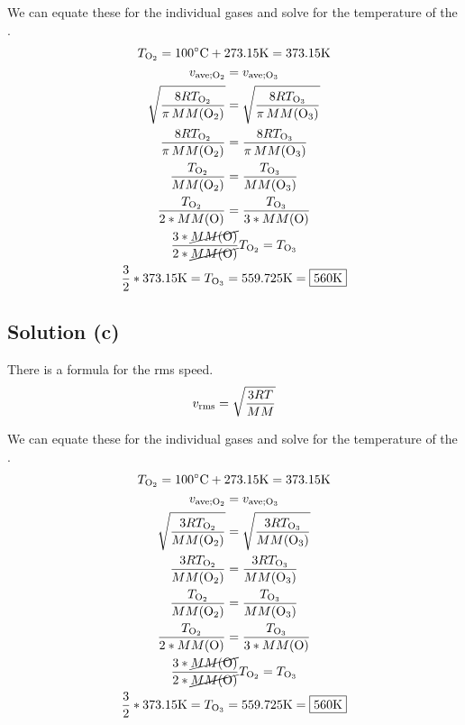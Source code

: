 \documentclass[10pt]{article}
\begin{document}
            We can equate these for the individual gases and solve for the temperature of the . 
            \begin{gather}
                T_{\ce{O2}} = 100\unit{\celsius} + 273.15\unit{\kelvin} = 373.15\unit{\kelvin}\\
                v_{\rm ave; \ce{O2}} =   v_{\rm ave; \ce{O3}}\\
                \sqrt{\frac{8RT_{\ce{O2}}}{\pi\,MM(\ce{O2})}}    =   \sqrt{\frac{8RT_{\ce{O3}}}{\pi\,MM(\ce{O3})}}\\
                \frac{8RT_{\ce{O2}}}{\pi\,MM(\ce{O2})}    =   \frac{8RT_{\ce{O3}}}{\pi\,MM(\ce{O3})}\\
                \frac{T_{\ce{O2}}}{MM(\ce{O2})}    =   \frac{T_{\ce{O3}}}{MM(\ce{O3})}\\
                \frac{T_{\ce{O2}}}{2 * MM(\ce{O})}    =   \frac{T_{\ce{O3}}}{3 * MM(\ce{O})}\\
                \frac{3 * \cancel{MM(\ce{O})}}{2 * \cancel{MM(\ce{O})}}T_{\ce{O2}}  =   T_{\ce{O3}}\\
                \frac{3}{2} * 373.15\unit{\kelvin}  =   T_{\ce{O3}}
                    =   559.725\unit{\kelvin}
                    =   \boxed{560\unit{\kelvin}}
            \end{gather}

        \subsection{Solution (c)}
            There is a formula for the rms speed. 
            \begin{gather}
                v_{\rm rms} =   \sqrt{\frac{3RT}{MM}}
            \end{gather}

            We can equate these for the individual gases and solve for the temperature of the . 
            \begin{gather}
                T_{\ce{O2}} = 100\unit{\celsius} + 273.15\unit{\kelvin} = 373.15\unit{\kelvin}\\
                v_{\rm ave; \ce{O2}} =   v_{\rm ave; \ce{O3}}\\
                \sqrt{\frac{3RT_{\ce{O2}}}{MM(\ce{O2})}}    =   \sqrt{\frac{3RT_{\ce{O3}}}{MM(\ce{O3})}}\\
                \frac{3RT_{\ce{O2}}}{MM(\ce{O2})}    =   \frac{3RT_{\ce{O3}}}{MM(\ce{O3})}\\
                \frac{T_{\ce{O2}}}{MM(\ce{O2})}    =   \frac{T_{\ce{O3}}}{MM(\ce{O3})}\\
                \frac{T_{\ce{O2}}}{2 * MM(\ce{O})}    =   \frac{T_{\ce{O3}}}{3 * MM(\ce{O})}\\
                \frac{3 * \cancel{MM(\ce{O})}}{2 * \cancel{MM(\ce{O})}}T_{\ce{O2}}  =   T_{\ce{O3}}\\
                \frac{3}{2} * 373.15\unit{\kelvin}  =   T_{\ce{O3}}
                    =   559.725\unit{\kelvin}
                    =   \boxed{560\unit{\kelvin}}
            \end{gather}
\end{document}

